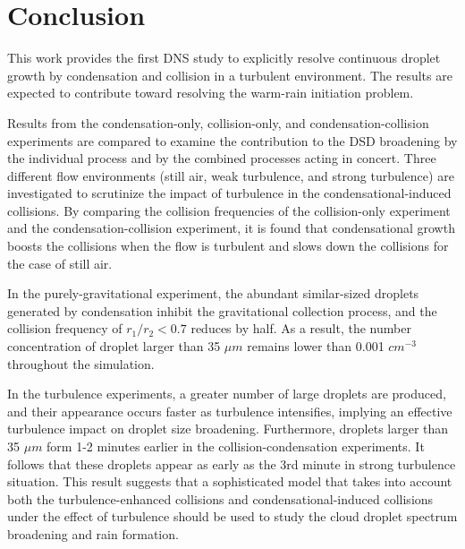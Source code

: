 \section{Conclusion} \label{sec:ch4_conclusion} %
This work provides the first DNS study to explicitly resolve continuous droplet growth by condensation and collision in a turbulent environment. The results are expected to contribute toward resolving the warm-rain initiation problem. 

Results from the condensation-only, collision-only, and condensation-collision experiments are compared to examine the contribution to the DSD broadening by the individual process and by the combined processes acting in concert. Three different flow environments (still air, weak turbulence, and strong turbulence) are investigated to scrutinize the impact of turbulence in the condensational-induced collisions. By comparing the collision frequencies of the collision-only experiment and the condensation-collision experiment, it is found that condensational growth boosts the collisions when the flow is turbulent and slows down the collisions for the case of still air. 

In the purely-gravitational experiment, the abundant similar-sized droplets generated by condensation inhibit the gravitational collection process, and the collision frequency of $r_1/r_2<0.7$ reduces by half. As a result, the number concentration of droplet larger than 35 $\mu m$ remains lower than 0.001 $cm^{-3}$ throughout the simulation. 

In the turbulence experiments, a greater number of large droplets are produced, and their appearance occurs faster as turbulence intensifies, implying an effective turbulence impact on droplet size broadening. Furthermore, droplets larger than 35 $\mu m$ form 1-2 minutes earlier in the collision-condensation experiments. It follows that these droplets appear as early as the 3rd minute in strong turbulence situation. This result suggests that a sophisticated model that takes into account both the turbulence-enhanced collisions and condensational-induced collisions under the effect of turbulence should be used to study the cloud droplet spectrum broadening and rain formation.

